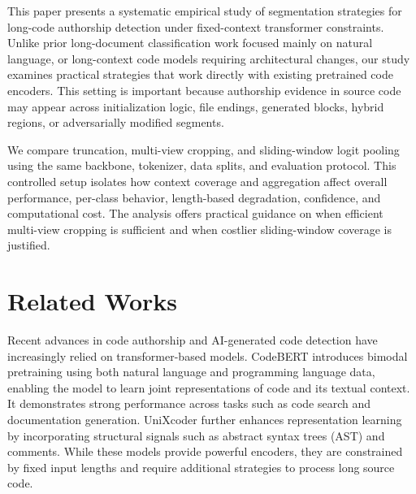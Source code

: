 \documentclass[conference]{IEEEtran}
\begin{document}
This paper presents a systematic empirical study of segmentation strategies for long-code authorship detection under fixed-context transformer constraints. Unlike prior long-document classification work focused mainly on natural language, or long-context code models requiring architectural changes, our study examines practical strategies that work directly with existing pretrained code encoders. This setting is important because authorship evidence in source code may appear across initialization logic, file endings, generated blocks, hybrid regions, or adversarially modified segments.

We compare truncation, multi-view cropping, and sliding-window logit pooling using the same backbone, tokenizer, data splits, and evaluation protocol. This controlled setup isolates how context coverage and aggregation affect overall performance, per-class behavior, length-based degradation, confidence, and computational cost. The analysis offers practical guidance on when efficient multi-view cropping is sufficient and when costlier sliding-window coverage is justified.



\section{Related Works}

Recent advances in code authorship and AI-generated code detection have increasingly relied on transformer-based models. CodeBERT \cite{feng-etal-2020-codebert} introduces bimodal pretraining using both natural language and programming language data, enabling the model to learn joint representations of code and its textual context. It demonstrates strong performance across tasks such as code search and documentation generation. UniXcoder \cite{guo-etal-2022-unixcoder} further enhances representation learning by incorporating structural signals such as abstract syntax trees (AST) and comments. While these models provide powerful encoders, they are constrained by fixed input lengths and require additional strategies to process long source code.
\end{document}
